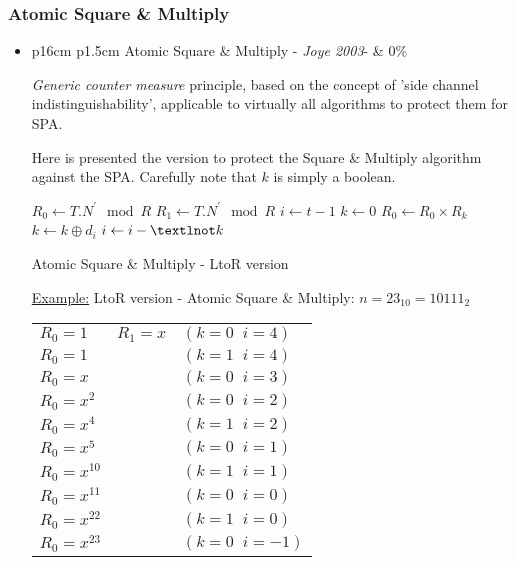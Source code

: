 \newpage
\subsubsection{Atomic Square \& Multiply}
\begin{itemize}
\item  	
		\begin{tabularx}{\linewidth}{ p{16cm} p{1.5cm}}
		Atomic Square \& Multiply - 
		\textit{Joye 2003}-  & $0\%$ 
		\end{tabularx}	
			\noindent

			\vspace{2mm}
			\textit{Generic counter measure} principle, based on the concept of 
			'side channel indistinguishability', applicable 
			to virtually all algorithms to protect them for SPA. 			
		
			Here is presented the version to protect the Square \& Multiply 
			algorithm against the SPA. Carefully note that $k$ is simply a boolean.			
			
			\begin{algorithm}[h]
				$R_0 \leftarrow	 T.N^{'} \mod R$ 
				$R_1 \leftarrow	 T.N^{'} \mod R$ \;	
				$i \leftarrow t-1$
				$k \leftarrow 0$	\;	
				{			 
					 $R_0 \leftarrow R_0 \times R_k $ \;
					 $k \leftarrow k \oplus d_i $  \;
					 $i \leftarrow i - \textlnot k $  	
				}									 
				\;
				\caption{Atomic Square \& Multiply - LtoR version}
			\end{algorithm}					
			\vspace{5mm}
									
   		\underline{Example:} 
   			LtoR version - Atomic Square \& Multiply:   			
   			$n=23_{10}=10111_2$\\
			\begin{tabularx}{\linewidth}{ p{2cm} p{11cm} p{3cm}}
				$R_0=1$ & $R_1=x$        	& $(k=0\;\;i=4)$\\
				$R_0=1$ & 		     	    & $(k=1\;\;i=4)$\\
				$R_0=x$ & 		     	    & $(k=0\;\;i=3)$\\
				$R_0=x^2$ & 		     	& $(k=0\;\;i=2)$\\
				$R_0=x^4$ & 		     	& $(k=1\;\;i=2)$\\
				$R_0=x^5$ & 		     	& $(k=0\;\;i=1)$\\
				$R_0=x^{10}$ & 		     	& $(k=1\;\;i=1)$\\
				$R_0=x^{11}$ & 		     	& $(k=0\;\;i=0)$\\
				$R_0=x^{22}$ & 		     	& $(k=1\;\;i=0)$\\
				$R_0=x^{23}$ & 		     	& $(k=0\;\;i=-1)$
			\end{tabularx}	
			

\end{itemize}
